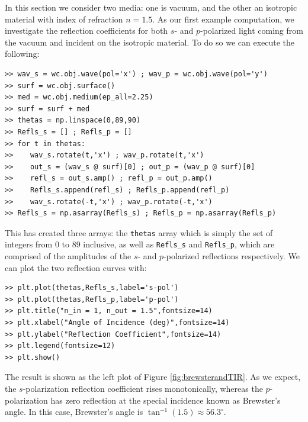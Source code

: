 \documentclass[11pt, reqno]{book}%
\newcounter{ct}
\newcommand{\tw}[1]{{\tt #1}}
\begin{document}
In this section we consider two media: one is vacuum, and the other an isotropic material with index of refraction $n=1.5$. As our first example computation, we investigate the reflection coefficients for both $s$- and $p$-polarized light coming from the vacuum and incident on the isotropic material. To do so we can execute the following:
\begin{verbatim}
>> wav_s = wc.obj.wave(pol='x') ; wav_p = wc.obj.wave(pol='y')
>> surf = wc.obj.surface()
>> med = wc.obj.medium(ep_all=2.25)
>> surf = surf + med
>> thetas = np.linspace(0,89,90)
>> Refls_s = [] ; Refls_p = []
>> for t in thetas:
>>    wav_s.rotate(t,'x') ; wav_p.rotate(t,'x')       
>>    out_s = (wav_s @ surf)[0] ; out_p = (wav_p @ surf)[0]
>>    refl_s = out_s.amp() ; refl_p = out_p.amp()  
>>    Refls_s.append(refl_s) ; Refls_p.append(refl_p)  
>>    wav_s.rotate(-t,'x') ; wav_p.rotate(-t,'x')  
>> Refls_s = np.asarray(Refls_s) ; Refls_p = np.asarray(Refls_p)
\end{verbatim}
\noindent This has created three arrays: the \tw{thetas} array which is simply the set of integers from 0 to 89 inclusive, as well as \tw{Refls\_s} and \tw{Refls\_p}, which are comprised of the amplitudes of the $s$- and $p$-polarized reflections respectively. We can plot the two reflection curves with:
\begin{verbatim}
>> plt.plot(thetas,Refls_s,label='s-pol')
>> plt.plot(thetas,Refls_p,label='p-pol')
>> plt.title("n_in = 1, n_out = 1.5",fontsize=14)
>> plt.xlabel("Angle of Incidence (deg)",fontsize=14)
>> plt.ylabel("Reflection Coefficient",fontsize=14)
>> plt.legend(fontsize=12)
>> plt.show()
\end{verbatim}
\noindent The result is shown as the left plot of Figure \ref{fig:brewsterandTIR}. As we expect, the $s$-polarization reflection coefficient rises monotonically, whereas the $p$-polarization has zero reflection at the special incidence known as Brewster's angle. In this case, Brewster's angle is $\tan^{-1}(1.5) \approx 56.3^\circ$.
\end{document}

